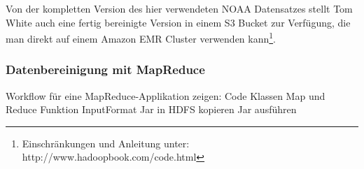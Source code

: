 Von der kompletten Version des hier verwendeten NOAA Datensatzes stellt Tom White auch eine fertig bereinigte Version in einem S3 Bucket zur Verfügung, die man direkt auf einem Amazon EMR Cluster verwenden kann\footnote{Einschränkungen und Anleitung unter: http://www.hadoopbook.com/code.html}.
\subsubsection*{Datenbereinigung mit MapReduce}
\label{chap:fund sec:core sub:handson mapred}
Workflow für eine MapReduce-Applikation zeigen:
Code
Klassen
Map und Reduce Funktion
InputFormat
Jar in HDFS kopieren
Jar ausführen
\begin{comment}
    \subsubsection*{Fully-distributed Cluster}
Installation von Hadoop auf allen beteiligten Maschinen
Einrichtung von passwordless ssh auf allen Maschinen
Evtl. Anpassung der /etc/hosts auf allen Maschinen
Editieren der ganzen Konfigurationsdateien (XML) und kopieren der gleichen Dateien auf alle beteiligten Maschinen
Editieren der Worker Datei auf dem NameNode
NameNode (HDFS) formatieren
Ausführen der Skripte auf dem NameNode

\subsubsection*{Hadoop in der Cloud}
Dabei kann man statt des HDFS zur Datenhaltung die jeweiligen Cloud Storage Systeme (Google Cloud Storage\footnote{https://cloud.google.com/blog/products/storage-data-transfer/hdfs-vs-cloud-storage-pros-cons-and-migration-tips} und Azure Storage / Azure Data Lake Storage\footnote{https://learn.microsoft.com/en-us/azure/hdinsight/hdinsight-hadoop-architecture}) nutzen.
Grafische Oberfläche zum Submitten von Jobs, etc.

\end{comment}


